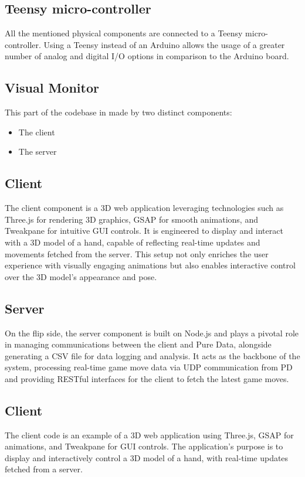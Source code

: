 \documentclass[11pt,a4paper]{report}
\begin{document}
\subsection*{Teensy micro-controller}
All the mentioned physical components are connected to a Teensy micro-controller. Using a Teensy instead of an Arduino allows the usage of a greater number of analog and digital I/O options in comparison to the Arduino board. 

\subsection*{Visual Monitor}
This part of the codebase in made by two distinct components:
\begin{itemize}
  \item The client
  \item The server
\end{itemize}
\subsection*{Client}
The client component is a 3D web application leveraging technologies such as Three.js for rendering 3D graphics, GSAP for smooth animations, and Tweakpane for intuitive GUI controls. It is engineered to display and interact with a 3D model of a hand, capable of reflecting real-time updates and movements fetched from the server. This setup not only enriches the user experience with visually engaging animations but also enables interactive control over the 3D model's appearance and pose.

\subsection*{Server}
On the flip side, the server component is built on Node.js and plays a pivotal role in managing communications between the client and Pure Data, alongside generating a CSV file for data logging and analysis. It acts as the backbone of the system, processing real-time game move data via UDP communication from PD and providing RESTful interfaces for the client to fetch the latest game moves.

\subsection*{Client}

The client code is an example of a 3D web application using Three.js, GSAP for animations, and Tweakpane for GUI controls. The application's purpose is to display and interactively control a 3D model of a hand, with real-time updates fetched from a server. 
\end{document}
